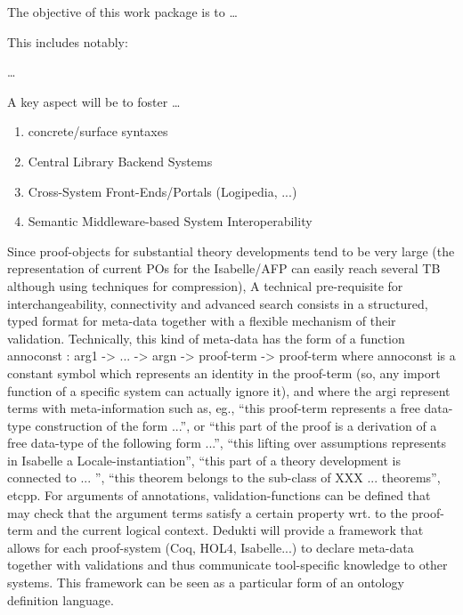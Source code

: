 \begin{workpackage}[id=structuring,wphases=0-48,type=RTD,
  short=Structured theories,%
  title=Structured theories,
  lead=FAU,
  FAURM=36,USaRM=36]
  

\begin{wpobjectives}
  The objective of this work package is to \ldots

This includes notably:
  \begin{compactitem}
  \item \ldots
  \end{compactitem}
  A key aspect will be to foster \ldots
\end{wpobjectives}


\begin{wpdescription}

\begin{enumerate}
\item concrete/surface syntaxes 
\item Central Library Backend Systems 
\item Cross-System Front-Ends/Portals (Logipedia, ...)
\item Semantic Middleware-based System Interoperability
\end{enumerate} 

Since proof-objects for substantial theory developments tend to be
very large (the representation of current POs for the Isabelle/AFP can
easily reach several TB although using techniques for compression), A
technical pre-requisite for interchangeability, connectivity and
advanced search consists in a structured, typed format for meta-data
together with a flexible mechanism of their validation. Technically,
this kind of meta-data has the form of a function annoconst : arg1 ->
... -> argn -> proof-term -> proof-term where annoconst is a constant
symbol which represents an identity in the proof-term (so, any import
function of a specific system can actually ignore it), and where the
argi represent terms with meta-information such as, eg., “this
proof-term represents a free data-type construction of the form ...”,
or “this part of the proof is a derivation of a free data-type of the
following form ...”, “this lifting over assumptions represents in
Isabelle a Locale-instantiation”, “this part of a theory
development is connected to ... ”, “this theorem belongs to the
sub-class of XXX ... theorems”, etcpp. For arguments of annotations,
validation-functions can be defined that may check that the argument
terms satisfy a certain property wrt. to the proof-term and the
current logical context. Dedukti will provide a framework that allows
for each proof-system (Coq, HOL4, Isabelle...) to declare meta-data
together with validations and thus communicate tool-specific knowledge
to other systems. This framework can be seen as a particular form of
an ontology definition language.
 

\end{wpdescription}
\end{workpackage}
